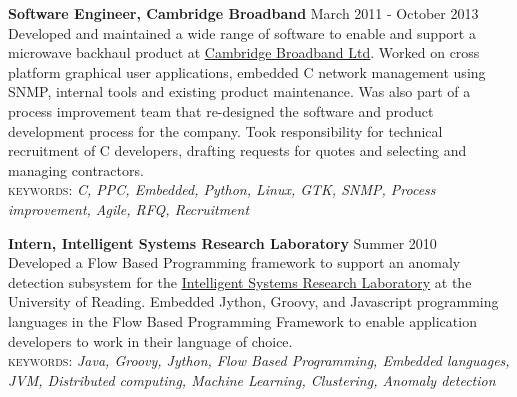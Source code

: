 \documentclass[10pt]{article}
\newcommand{\linkto}[2]{\href{#1}{\color{darkblue}\setulcolor{darkblue}\ul{#2}}}
\newcommand{\blankline}{\quad\pagebreak[2]}
\begin{document}
\blankline



\textbf{Software Engineer, Cambridge Broadband } \hfill March 2011 - October 2013 \\
Developed and maintained a wide range of software to enable and support a microwave backhaul product at \linkto{http://cbnl.com}{Cambridge Broadband Ltd}. Worked on cross platform graphical user applications, embedded C network management using SNMP, internal tools and existing product maintenance. Was also part of a process improvement team that re-designed the software and product development process for the company. Took responsibility for technical recruitment of C developers, drafting requests for quotes and selecting and managing contractors.  \\
{\small\textsc{keywords:} \emph{C, PPC, Embedded, Python, Linux, GTK, SNMP, Process improvement, Agile, RFQ, Recruitment}}

\blankline

\textbf{Intern, Intelligent Systems Research Laboratory} \hfill Summer 2010 \\
Developed a Flow Based Programming framework to support an anomaly detection subsystem for the \linkto{http://www.isr.reading.ac.uk/}{Intelligent Systems Research Laboratory} at the University of Reading. Embedded Jython, Groovy, and Javascript programming languages in the Flow Based Programming Framework to enable application developers to work in their language of choice. \\
{\small\textsc{keywords:} \emph{Java, Groovy, Jython, Flow Based Programming, Embedded languages, JVM, Distributed computing, Machine Learning, Clustering, Anomaly detection}}

\blankline

\end{document}
